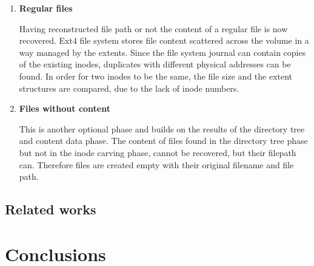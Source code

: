 \documentclass{acm_proc_article-sp}
\begin{document}
\begin{enumerate}
\item \textbf{Regular files}

Having reconstructed file path or not the content of a regular file is now recovered. Ext4 file system stores file content scattered across the volume in a way managed by the extents. Since the file system journal can contain copies of the existing inodes, duplicates with different physical addresses can be found. In order for two inodes to be the same, the file size and the extent structures are compared, due to the lack of inode numbers.
\item \textbf{Files without content}

This is another optional phase and builds on the results of the directory tree and content data phase. The content of files found in the directory tree phase but not in the inode carving phase, cannot be recovered, but their filepath can. Therefore files are created empty with their original filename and file path.
\end{enumerate}

\subsection{Related works}

\section{Conclusions}




\balancecolumns
\end{document}
